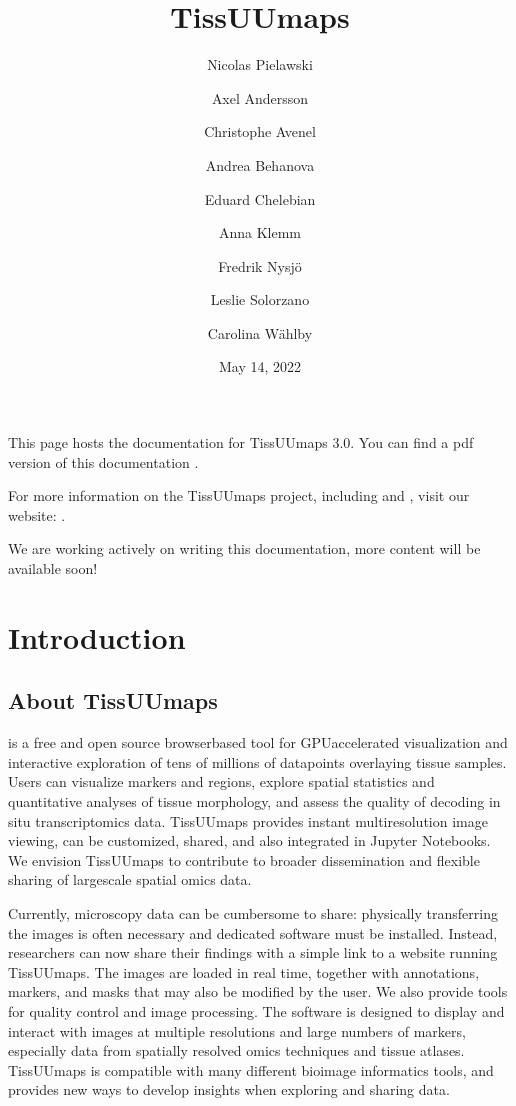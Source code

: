 \documentclass[letterpaper,10pt,english,openany,oneside]{sphinxmanual}
\title{TissUUmaps}
\date{May 14, 2022}
\author{Nicolas Pielawski\and Axel Andersson\and Christophe Avenel\and Andrea Behanova\and Eduard Chelebian\and Anna Klemm\and Fredrik Nysjö\and Leslie Solorzano\and Carolina Wählby}
\begin{document}
\pagestyle{empty}
\sphinxmaketitle
\pagestyle{plain}
\sphinxtableofcontents
\pagestyle{normal}
\label{\detokenize{index::doc}}


\sphinxAtStartPar
This page hosts the documentation for TissUUmaps 3.0. You can find a pdf version of this documentation .

\sphinxAtStartPar
For more information on the TissUUmaps project, including  and , visit our website: .

\begin{sphinxShadowBox}

\sphinxAtStartPar
We are working actively on writing this documentation, more content will be available soon!
\end{sphinxShadowBox}

\sphinxstepscope


\chapter{Introduction}
\label{\detokenize{docs/intro/index:introduction}}\label{\detokenize{docs/intro/index::doc}}
\sphinxstepscope


\section{About TissUUmaps}
\label{\detokenize{docs/intro/about:about-tissuumaps}}\label{\detokenize{docs/intro/about::doc}}
\sphinxAtStartPar
{} is a free and open source browser\sphinxhyphen{}based tool for GPU\sphinxhyphen{}accelerated visualization and interactive exploration of tens of millions of datapoints overlaying tissue samples. Users can visualize markers and regions, explore spatial statistics and quantitative analyses of tissue morphology, and assess the quality of decoding in situ transcriptomics data. TissUUmaps provides instant multi\sphinxhyphen{}resolution image viewing, can be customized, shared, and also integrated in Jupyter Notebooks. We envision TissUUmaps to contribute to broader dissemination and flexible sharing of large\sphinxhyphen{}scale spatial omics data.

\sphinxAtStartPar
Currently, microscopy data can be cumbersome to share: physically transferring the images is often necessary and dedicated software must be installed. Instead, researchers can now share their findings with a simple link to a website running TissUUmaps. The images are loaded in real time, together with annotations, markers, and masks that may also be modified by the user. We also provide tools for quality control and image processing. The software is designed to display and interact with images at multiple resolutions and large numbers of markers, especially data from spatially resolved omics techniques and tissue atlases. TissUUmaps is compatible with many different bioimage informatics tools, and provides new ways to develop insights when exploring and sharing data.
\end{document}

